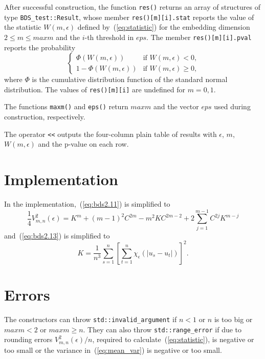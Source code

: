 After successful construction, the function \verb|res()| returns an
array of structures of type \verb|BDS_test::Result|, whose member
\verb|res()[m][i].stat| reports the value of the statistic $W(m,
\epsilon)$ defined by~(\ref{eq:statistic}) for the embedding dimension
$2 \leq m \leq \mathit{maxm}$ and the $i$-th threshold in
$\mathit{eps}$. The member \verb|res()[m][i].pval| reports the
probability
\[ \left\{ \begin{array}{ll}
  \Phi(W(m, \epsilon)) & \mbox{if $W(m, \epsilon) < 0$,} \\
  1 - \Phi(W(m, \epsilon)) & \mbox{if $W(m, \epsilon) \geq 0$,}
\end{array} \right. \]
where $\Phi$ is the cumulative distribution function of the standard
normal distribution. The values of \verb|res()[m][i]| are undefined
for $m = 0, 1$.

The functions \verb|maxm()| and \verb|eps()| return $\mathit{maxm}$
and the vector $\mathit{eps}$ used during construction, respectively.

The operator \verb|<<| outputs the four-column plain table of results
with $\mathit{\epsilon}$, $m$, $W(m, \epsilon)$ and the p-value on
each row.

\section{Implementation}

In the implementation,~(\ref{eq:bds2.11}) is simplified to
\begin{equation} \label{eq:simpleV}
  \frac{1}{4}V_{m, n}^2(\epsilon) = K^m + (m - 1)^2 C^{2m} - m^2 K
  C^{2m -2} + 2 \sum_{j = 1}^{m - 1} C^{2j} K^{m - j}
\end{equation}
and~(\ref{eq:bds2.13}) is simplified to
\begin{equation} \label{eq:bds2.13s}
  K = \frac{1}{n^3} \sum_{s = 1}^n \left[ \sum_{t = 1}^n
    \chi_{\epsilon}(|u_s - u_t|) \right]^2.
\end{equation}

\section{Errors}

The constructors can throw \verb|std::invalid_argument| if $n < 1$ or
$n$ is too big or $\mathit{maxm} < 2$ or $\mathit{maxm} \geq n$. They
can also throw \verb|std::range_error| if due to rounding errors
$V_{m, n}^2(\epsilon) / n$, required to
calculate~(\ref{eq:statistic}), is negative or too small or the
variance in~(\ref{eq:mean_var}) is negative or too small.

